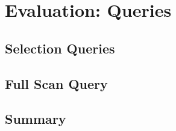 {\chapter{Evaluation: Queries}
\label{chap:Eval_6}


\section{Selection Queries}


\section{Full Scan Query}


\section{Summary}
}